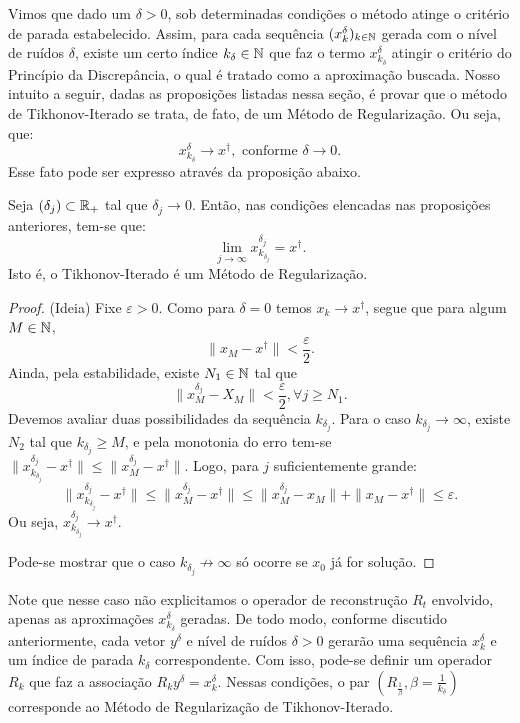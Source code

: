 Vimos que dado um $\delta>0$, sob determinadas condições o método atinge o critério de parada estabelecido. Assim, para cada sequência $(x^\delta_k)_{k \in \mathbb N}$ gerada com o nível de ruídos $\delta$, existe um certo índice $k_\delta\in \mathbb N$ que faz o termo $x^\delta_{k_\delta}$ atingir o critério do Princípio da Discrepância, o qual é tratado como a aproximação buscada. Nosso intuito a seguir, dadas as proposições listadas nessa seção, é provar que o método de Tikhonov-Iterado se trata, de fato, de um Método de Regularização. Ou seja, que:
\[
x_{k_\delta}^\delta \to x^\dag, \text{ conforme } \delta\to 0.
\]
Esse fato pode ser expresso através da proposição abaixo.
\begin{prop}
    Seja $(\delta_j)\subset \mathbb{R}_+$ tal que $\delta_j \to 0$. Então, nas condições elencadas nas proposições anteriores, tem-se que:
    \[
    \lim_{j\to \infty} x^{\delta_j}_{k_{\delta_j}} = x^\dag.
    \]
    Isto é, o Tikhonov-Iterado é um Método de Regularização.
\end{prop}
\begin{proof}
    (Ideia) Fixe $\varepsilon>0$. Como para $\delta=0$ temos $x_k \to x^\dag$, segue que para algum $M\in \mathbb N$,
    \[
        \| x_M - x^\dag \| < \frac \varepsilon 2.
    \]
    Ainda, pela estabilidade, existe $N_1 \in \mathbb N$ tal que 
    \[
        \| x_M^{\delta_j} - X_M\| < \frac \varepsilon 2, \forall j \geq N_1.
    \]
    Devemos avaliar duas possibilidades da sequência $k_{\delta_j}$. Para o caso $k_{\delta_j}\to\infty$, existe $N_2$ tal que $k_{\delta_j}\geq M$, e pela monotonia do erro tem-se $\|x^{\delta_j}_{k_{\delta_j}}-x^\dag\| \leq \|x^{\delta_j}_M-x^\dag\|$. Logo, para $j$ suficientemente grande:
    \[
        \|x^{\delta_j}_{k_{\delta_j}}-x^\dag\| \leq \|x^{\delta_j}_M-x^\dag\|
        \leq \|x^{\delta_j}_M-x_M\| + \|x_M-x^\dag\| \leq \varepsilon.
    \]
    Ou seja, $x^{\delta_j}_{k_{\delta_j}} \to x^\dag$. 
    
    Pode-se mostrar que o caso $k_{\delta_j}\not \to \infty$ só ocorre se $x_0$ já for solução.    
\end{proof}
\begin{obs}
    Note que nesse caso não explicitamos o operador de reconstrução $R_t$ envolvido, apenas as aproximações $x_{k_\delta}^\delta$ geradas. De todo modo, conforme discutido anteriormente, cada vetor $y^\delta$ e nível de ruídos $\delta>0$ gerarão uma sequência $x^\delta_k$ e um índice de parada $k_\delta$ correspondente. Com isso, pode-se definir um operador $R_k$ que faz a associação $R_k y^\delta = x^\delta_k$. Nessas condições, o par $(R_{\frac 1 \beta}, \beta = \frac 1 {k_\delta})$ corresponde ao Método de Regularização de Tikhonov-Iterado.
\end{obs}

